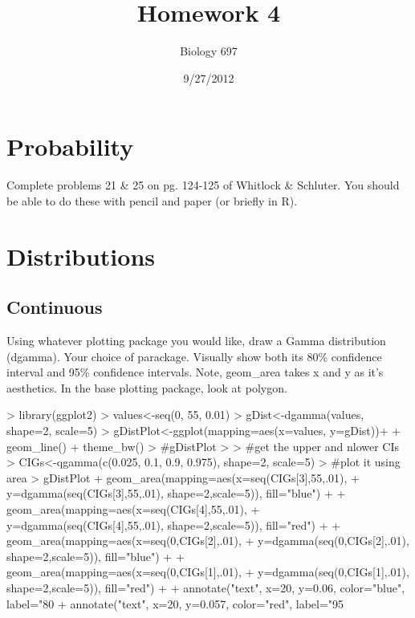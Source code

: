 \documentclass{article}
\begin{document}


\title{Homework 4} %
\author{Biology 697} %
\date{9/27/2012} %
\maketitle %


\section{Probability}
  Complete problems 21 \& 25 on pg. 124-125 of Whitlock \& Schluter.  You should be able to do these with pencil and paper (or briefly in R).

\section{Distributions}
\subsection{Continuous}
Using whatever plotting package you would like, draw a Gamma distribution (dgamma).  Your choice of parackage.  Visually show both its 80\% confidence interval and 95\% confidence intervals.  Note, geom\_area takes x and y as it's aesthetics.  In the base plotting package, look at polygon.\\

\begin{Schunk}
\begin{Sinput}
> library(ggplot2)
> values<-seq(0, 55, 0.01)
> gDist<-dgamma(values, shape=2, scale=5)
> gDistPlot<-ggplot(mapping=aes(x=values, y=gDist))+
+           geom_line() + theme_bw()
> #gDistPlot
> 
> #get the upper and nlower CIs
> CIGs<-qgamma(c(0.025, 0.1, 0.9, 0.975), shape=2, scale=5)
> #plot it using area
> gDistPlot + geom_area(mapping=aes(x=seq(CIGs[3],55,.01),
+                                   y=dgamma(seq(CIGs[3],55,.01), shape=2,scale=5)), fill="blue") +
+             geom_area(mapping=aes(x=seq(CIGs[4],55,.01),
+                                   y=dgamma(seq(CIGs[4],55,.01), shape=2,scale=5)), fill="red") +
+             geom_area(mapping=aes(x=seq(0,CIGs[2],.01),
+                                   y=dgamma(seq(0,CIGs[2],.01), shape=2,scale=5)), fill="blue") +
+             geom_area(mapping=aes(x=seq(0,CIGs[1],.01),
+                                   y=dgamma(seq(0,CIGs[1],.01), shape=2,scale=5)), fill="red") +
+             annotate("text", x=20, y=0.06, color="blue", label="80%") +
+             annotate("text", x=20, y=0.057, color="red", label="95%")
\end{Sinput}
\end{Schunk}
\end{document}
